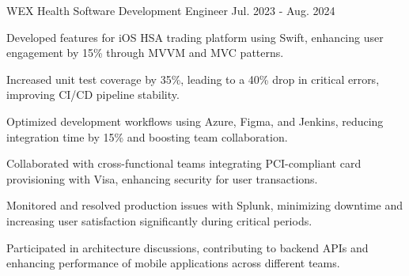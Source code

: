 


\begin{cventries}

        \cventry
          {WEX Health} %
          {Software Development Engineer} %
          {} %
          {Jul. 2023 - Aug. 2024} %
          {
            \begin{cvitems} %
            \item {Developed features for iOS HSA trading platform using Swift, enhancing user engagement by 15\% through MVVM and MVC patterns.}
    \item {Increased unit test coverage by 35\%, leading to a 40\% drop in critical errors, improving CI/CD pipeline stability.}
    \item {Optimized development workflows using Azure, Figma, and Jenkins, reducing integration time by 15\% and boosting team collaboration.}
    \item {Collaborated with cross-functional teams integrating PCI-compliant card provisioning with Visa, enhancing security for user transactions.}
    \item {Monitored and resolved production issues with Splunk, minimizing downtime and increasing user satisfaction significantly during critical periods.}
    \item {Participated in architecture discussions, contributing to backend APIs and enhancing performance of mobile applications across different teams.}
            \end{cvitems}
          }
\end{cventries}

